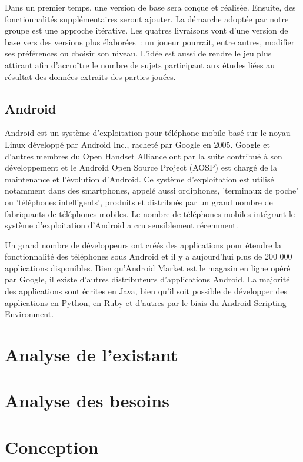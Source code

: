\documentclass[a4paper,11pt,french]{article}
\begin{document}
Dans un premier temps, une version de base sera conçue et réalisée. Ensuite, des fonctionnalités supplémentaires seront ajouter. La démarche adoptée par notre groupe est une approche itérative. Les quatres livraisons vont d'une version de base vers des versions plus élaborées~: un joueur pourrait, entre autres, modifier ses préférences ou choisir son niveau. L'idée est aussi de rendre le jeu plus attirant afin d'accroître le nombre de sujets participant aux études liées au résultat des données extraits des parties jouées.


\subsection{Android}

Android est un système d'exploitation pour téléphone mobile basé sur le noyau Linux développé par Android Inc., racheté par Google en 2005. Google et d'autres membres du Open Handset Alliance ont par la suite contribué à son développement et le Android Open Source Project (AOSP) est chargé de la maintenance et l'évolution d'Android. Ce système d'exploitation est utilisé notamment dans des smartphones, appelé aussi ordiphones, 'terminaux de poche' ou 'téléphones intelligents', produits et distribués par un grand nombre de fabriquants de téléphones mobiles. Le nombre de téléphones mobiles intégrant le système d'exploitation d'Android a cru sensiblement récemment.

Un grand nombre de développeurs ont créés des applications pour étendre la fonctionnalité des téléphones sous Android et il y a aujourd'hui plus de 200 000 applications disponibles. Bien qu'Android Market est le magasin en ligne opéré par Google, il existe d'autres distributeurs d'applications Android. La majorité des applications sont écrites en Java, bien qu'il soit possible de développer des applications en Python, en Ruby et d'autres par le biais du Android Scripting Environment. 

 
\section{Analyse de l'existant}

\section{Analyse des besoins}

\section{Conception}
\end{document}
